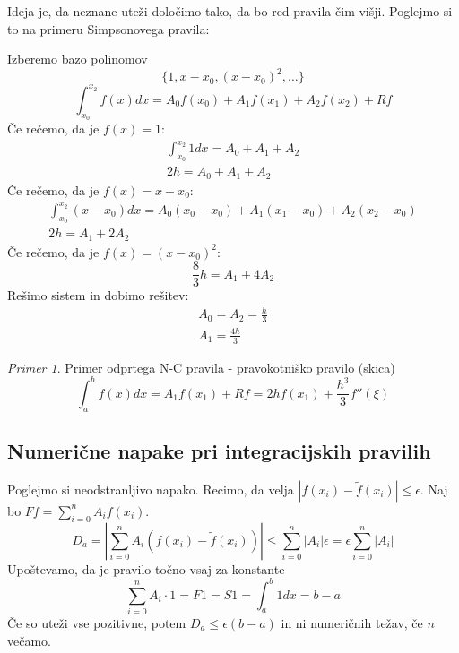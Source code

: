 \documentclass[a4paper,12pt]{article}
\theoremstyle{definition}
\theoremstyle{remark}
\newtheorem*{ex}{Primer}
\begin{document}
Ideja je, da neznane uteži določimo tako, da bo red pravila čim višji. Poglejmo si to na primeru Simpsonovega pravila:

Izberemo bazo polinomov
\begin{equation*}
    \{1, x-x_0, (x-x_0)^2, \dots\}
\end{equation*}
\begin{equation*}
    \int_{x_0}^{x_2}f(x) dx = A_0 f(x_0) + A_1 f(x_1) + A_2 f(x_2) + Rf
\end{equation*}
Če rečemo, da je $f(x) = 1$:
\begin{gather*}
    \int_{x_0}^{x_2} 1 dx = A_0 + A_1 + A_2 \\
    2h =  A_0 + A_1 + A_2
\end{gather*}
Če rečemo, da je $f(x) = x-x_0$:
\begin{gather*}
    \int_{x_0}^{x_2} (x-x_0) dx = A_0 (x_0-x_0) + A_1(x_1-x_0) + A_2(x_2-x_0) \\
    2h = A_1 + 2A_2
\end{gather*}
Če rečemo, da je $f(x) = (x-x_0)^2$:
\begin{equation*}
    \frac{8}{3} h = A_1 + 4A_2
\end{equation*}
Rešimo sistem in dobimo rešitev:
\begin{gather*}
    A_0 = A_2 = \frac{h}{3}\\
    A_1 = \frac{4h}{3}
\end{gather*}

\begin{ex}
    Primer odprtega N-C pravila - pravokotniško pravilo (skica)
    \begin{equation*}
        \int_{a}^{b} f(x) dx = A_1 f(x_1) + Rf = 2hf(x_1) + \frac{h^3}{3} f''(\xi)
    \end{equation*}
\end{ex}

\subsection{Numerične napake pri integracijskih pravilih}
Poglejmo si neodstranljivo napako. Recimo, da velja $|f(x_i) - \tilde{f}(x_i)| \leq \epsilon$. Naj bo $F f = \sum_{i = 0}^{n} A_i f(x_i)$.
\begin{equation*}
    D_a = \left|\sum_{i=0}^{n} A_i (f(x_i) - \tilde{f}(x_i)) \right| \leq \sum_{i=0}^{n} \left|A_i \right| \epsilon = \epsilon \sum_{i=0}^{n} \left|A_i\right|
\end{equation*}
Upoštevamo, da je pravilo točno vsaj za konstante
\begin{equation*}
    \sum_{i=0}^{n} A_i \cdot 1 = F1 = S1 = \int_{a}^{b} 1dx = b-a
\end{equation*}
Če so uteži vse pozitivne, potem $D_a \leq \epsilon(b-a)$ in ni numeričnih težav, če $n$ večamo.
\end{document}
